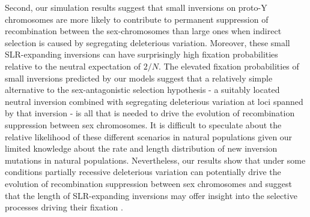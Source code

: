 \documentclass[11pt]{article}
\begin{document}
Second, our simulation results suggest that small inversions on proto-Y chromosomes are more likely to contribute to permanent suppression of recombination between the sex-chromosomes than large ones when indirect selection is caused by segregating deleterious variation. Moreover, these small SLR-expanding inversions can have surprisingly high fixation probabilities relative to the neutral expectation of $2/N$. The elevated fixation probabilities of small inversions predicted by our  models suggest that a relatively simple alternative to the sex-antagonistic selection hypothesis - a suitably located neutral inversion combined with segregating deleterious variation at loci spanned by that inversion - is all that is needed to drive the evolution of recombination suppression between sex chromosomes. It is difficult to speculate about the relative likelihood of these different scenarios in natural populations given our limited knowledge about the rate and length distribution of new inversion mutations in natural populations. Nevertheless, our results show that under some conditions partially recessive deleterious variation can potentially drive the evolution of recombination suppression between sex chromosomes and suggest that the length of SLR-expanding inversions may offer insight into the selective processes driving their fixation \citep{vanValenLevins1968, Santos1986, ConnallonOlito2020}. 
\end{document}
